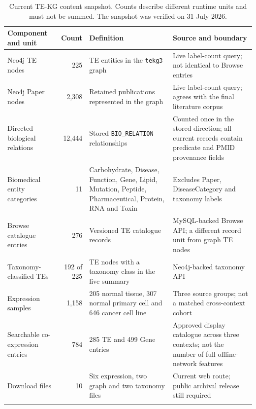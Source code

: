 \begin{table}[!t]
\caption{Current TE-KG content snapshot. Counts describe different runtime units and must not be summed. The snapshot was verified on 31 July 2026.\label{tab:snapshot}}
\begin{tabularx}{\textwidth}{@{}l r X X@{}}
\toprule
Component and unit & Count & Definition & Source and boundary \\
\midrule
Neo4j TE nodes & 225 & TE entities in the \texttt{tekg3} graph & Live label-count query; not identical to Browse entries \\
Neo4j Paper nodes & 2,308 & Retained publications represented in the graph & Live label-count query; agrees with the final literature corpus \\
Directed biological relations & 12,444 & Stored \texttt{BIO\_RELATION} relationships & Counted once in the stored direction; all current records contain predicate and PMID provenance fields \\
Biomedical entity categories & 11 & Carbohydrate, Disease, Function, Gene, Lipid, Mutation, Peptide, Pharmaceutical, Protein, RNA and Toxin & Excludes Paper, DiseaseCategory and taxonomy labels \\
Browse catalogue entries & 276 & Versioned TE catalogue records & MySQL-backed Browse API; a different record unit from graph TE nodes \\
Taxonomy-classified TEs & 192 of 225 & TE nodes with a taxonomy class in the live summary & Neo4j-backed taxonomy API \\
Expression samples & 1,158 & 205 normal tissue, 307 normal primary cell and 646 cancer cell line & Three source groups; not a matched cross-context cohort \\
Searchable co-expression entries & 784 & 285 TE and 499 Gene entries & Approved display catalogue across three contexts; not the number of full offline-network features \\
Download files & 10 & Six expression, two graph and two taxonomy files & Current web route; public archival release still required \\
\botrule
\end{tabularx}
\end{table}


